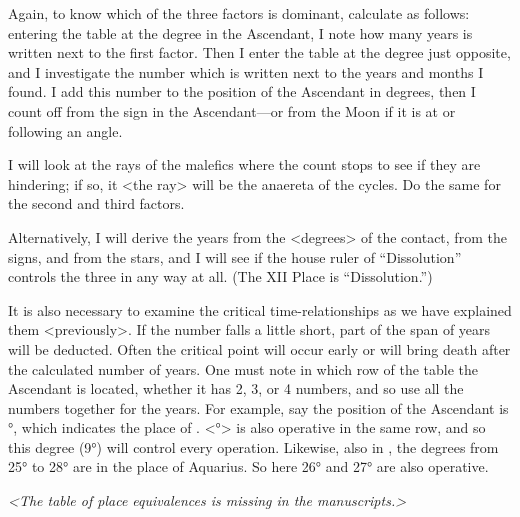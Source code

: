 Again, to know which of the three factors is dominant, calculate as follows: entering the table at the degree in the Ascendant, I note how many years is written next to the first factor. Then I enter the table at
the degree just opposite, and I investigate the number which is written next to the years and months I found. I add this number to the position of the Ascendant in degrees, then I count off from the sign in the
Ascendant—or from the Moon if it is at or following an angle. 

I will look at the rays of the malefics where the count stops to see if they are hindering; if so, it <the ray> will be the anaereta of the cycles. Do the same for the second and third factors.

Alternatively, I will derive the years from the <degrees> of the contact, from the signs, and from the stars, and I will see if the house ruler of “Dissolution” controls the three in any way at all. (The XII Place
is “Dissolution.”) 

It is also necessary to examine the critical time-relationships as we have explained them <previously>. If the number falls a little short, part of the span of years will be deducted. Often the critical
point will occur early or will bring death after the calculated number of years. One must note in which row of the table the Ascendant is located, whether it has 2, 3, or 4 numbers, and so use all the numbers together for the years. For example, say the position of the Ascendant is \Cancer\xspace 8°, which indicates the place of \Taurus. <\Cancer\xspace 9°> is also operative in the same row, and so this degree (9°) will control every operation. Likewise, also in \Cancer, the degrees from 25° to 28° are in the place of Aquarius. So here 26°
and 27° are also operative.

\textit{<The table of place equivalences is missing in the manuscripts.>}
\newpage